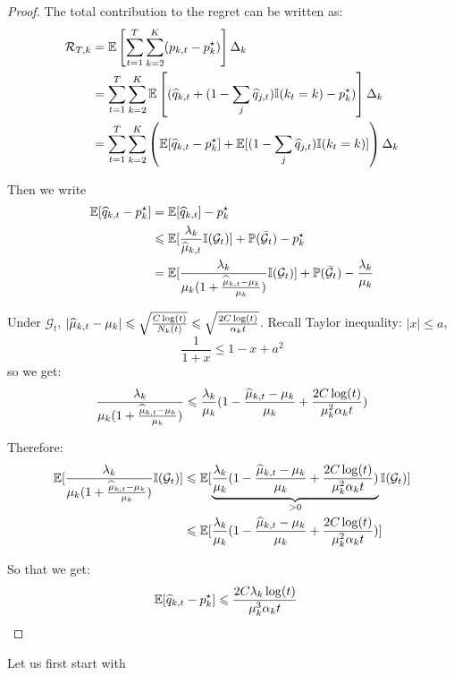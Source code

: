 \begin{proof}
The total contribution to the regret can be written as:
\begin{align*}
\mathcal{R}_{T,k} &= \mathbb{E}\left[\sum_{t=1}^T \sum_{k=2}^K (p_{k,t} - p^\star_k)\right]\Delta_k \\
&= \sum_{t=1}^T \sum_{k=2}^K \mathbb{E}\left[ (\widehat{q}_{k, t} + (1-\sum_j \widehat{q}_{j, t}) \mathbb{I}(k_t=k) - p_k^\star) \right]\Delta_k \\
&= \sum_{t=1}^T \sum_{k=2}^K \left( \mathbb{E} [ \widehat{q}_{k, t} - p_k^\star]  + \mathbb{E} [ (1-\sum_j \widehat{q}_{j, t}) \mathbb{I}(k_t=k) ] \right)\Delta_k \\
\end{align*}

Then we write 
\begin{align*}
	\mathbb{E} [ \widehat{q}_{k, t} - p_k^\star]  &= \mathbb{E} [ \widehat{q}_{k, t}] - p_k^\star \\
	&\leqslant  \mathbb{E} [ \frac{\lambda_k}{\widehat{\mu}_{k, t}} \mathbb{I}(\mathcal{G}_{t})] + \mathbb{P}(\bar {\mathcal{G}}_t)  - p_k^\star \\
	&=  \mathbb{E} [ \frac{\lambda_k}{ \mu_{k}(1 + \frac{\widehat{\mu}_{k, t} - \mu_{k}}{\mu_{k}})} \mathbb{I}(\mathcal{G}_{t})] + \mathbb{P}(\bar {\mathcal{G}}_t)  - \frac{\lambda_{k}}{\mu_{k}} \\
\end{align*}

Under $\mathcal{G}_{t}$, $ | \widehat{\mu}_{k, t} - \mu_{k}| \leqslant \sqrt{\frac{C \log(t)}{N_k(t)}} \leqslant \sqrt{\frac{2 C \log(t)}{\alpha_{k} t}} $. Recall Taylor inequality: $|x| \leq a$, 
\[
\frac{1}{1 + x} \leq 1 - x + a^2	
\]
so we get:
\[
\frac{\lambda_k}{ \mu_{k}(1 + \frac{\widehat{\mu}_{k, t} - \mu_{k}}{\mu_{k}})} \leqslant \frac{\lambda_{k}}{\mu_{k}}(1 - \frac{\widehat{\mu}_{k, t} - \mu_{k}}{\mu_{k}} + \frac{2 C \log(t)}{\mu_{k}^2 \alpha_{k} t}) 
\]

Therefore:
\begin{align*}
	\mathbb{E} [ \frac{\lambda_k}{ \mu_{k}(1 + \frac{\widehat{\mu}_{k, t} - \mu_{k}}{\mu_{k}})} \mathbb{I}(\mathcal{G}_{t})] &\leqslant  \mathbb{E} [ \underbrace{\frac{\lambda_{k}}{\mu_{k}}(1 - \frac{\widehat{\mu}_{k, t} - \mu_{k}}{\mu_{k}} + \frac{2 C \log(t)}{\mu_{k}^2 \alpha_{k} t})}_{> 0} \mathbb{I}(\mathcal{G}_{t})] \\
&\leqslant  \mathbb{E} [ \frac{\lambda_{k}}{\mu_{k}}(1 - \frac{\widehat{\mu}_{k, t} - \mu_{k}}{\mu_{k}} + \frac{2 C \log(t)}{\mu_{k}^2 \alpha_{k} t})]
\end{align*}

So that we get:
\begin{align*}
	\mathbb{E} [ \widehat{q}_{k, t} - p_k^\star] &\leqslant  \frac{2 C \lambda_{k} \log(t)}{\mu_{k}^3 \alpha_{k} t}
\end{align*}




\end{proof}
Let us first start with 

